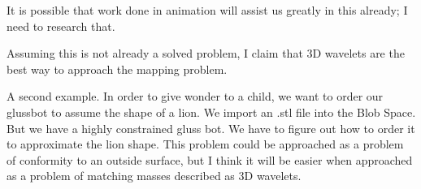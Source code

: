\documentclass[11pt]{article}
\begin{document}
It is possible that work done in animation will assist us greatly in this already; I need
to research that.

Assuming this is not already a solved problem, I claim that 3D wavelets are the best way
to approach the mapping problem.

A second example.  In order to give wonder to a child, we want to order our glussbot to
assume the shape of a lion. We import an .stl file into the Blob Space.  But we have a highly
constrained gluss bot.  We have to figure out how to order it to approximate the lion shape.
This problem could be approached as a problem of conformity to an outside surface, but I think
it will be easier when approached as a problem of matching masses described as 3D wavelets.



\section{}
\end{document}

